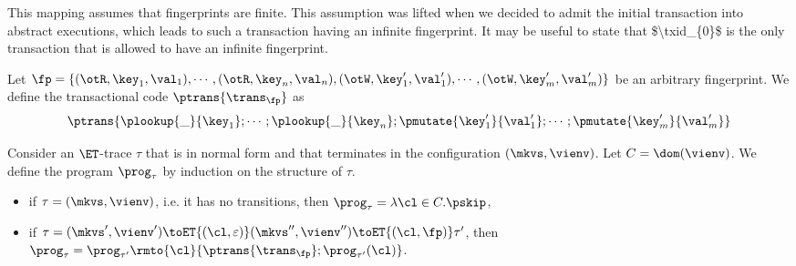 \begin{definition}
\ac{This mapping assumes that fingerprints are finite. This assumption was lifted when we 
decided to admit the initial transaction into abstract executions, which leads to such a transaction 
having an infinite fingerprint. It may be useful to state that $\txid_{0}$ is the only transaction that is 
allowed to have an infinite fingerprint.}

Let $\fp = \{(\otR, \key_1, \val_1), \cdots, (\otR, \key_{n}, \val_{n}), (\otW, \key'_{1}, \val'_{1}), \cdots, (\otW, \key'_{m}, \val'_{m})\}$ be an 
arbitrary fingerprint. We define the transactional code $\ptrans{\trans_{\fp}}$ as 
\[
\ptrans{\plookup{\_}{\key_1}; \cdots ; \plookup{\_}{\key_{n}}; \pmutate{\key'_1}{\val'_1}; \cdots ; \pmutate{\key'_{m}}{\val'_{m}}}
\]

Consider an $\ET$-trace $\tau$ that is in normal form and that terminates in the configuration $(\mkvs, \vienv)$. Let $C = \dom(\vienv)$. 
We define the program $\prog_{\tau}$ by induction on the structure of $\tau$. 
\begin{itemize}
\item if $\tau = (\mkvs, \vienv)$, i.e. it has no transitions, then $\prog_{\tau} = \lambda \cl \in C. \pskip$, 
\item if $\tau = (\mkvs', \vienv') \toET{(\cl, \varepsilon)} (\mkvs'', \vienv'') \toET{(\cl, \fp)} \tau'$, then 
$\prog_{\tau} = \prog_{\tau'}\rmto{\cl}{\ptrans{\trans_{\fp}} ; \prog_{\tau'}(\cl)}$.
\end{itemize}
\end{definition}


